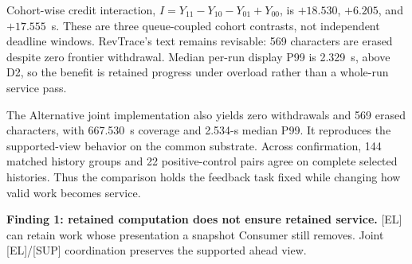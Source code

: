 Cohort-wise credit interaction,
$I=Y_{11}-Y_{10}-Y_{01}+Y_{00}$, is $+18.530$, $+6.205$, and $+17.555$~s.
These are three queue-coupled cohort contrasts, not independent deadline
windows. RevTrace's text remains revisable: 569 characters are erased
despite zero frontier withdrawal. Median per-run display P99 is 2.329~s,
above D2, so the benefit is retained progress under overload rather than
a whole-run service pass.

The Alternative joint implementation also yields zero withdrawals and 569
erased characters, with 667.530~s coverage and 2.534-s median P99. It
reproduces the supported-view behavior on the common substrate. Across
confirmation, 144 matched history groups and 22 positive-control pairs
agree on complete selected histories. Thus the comparison holds the
feedback task fixed while changing how valid work becomes service.
\par\noindent\textbf{Finding 1: retained computation does not ensure retained service.}
[EL] can retain work whose presentation a snapshot Consumer still removes.
Joint [EL]/[SUP] coordination preserves the supported ahead view.

